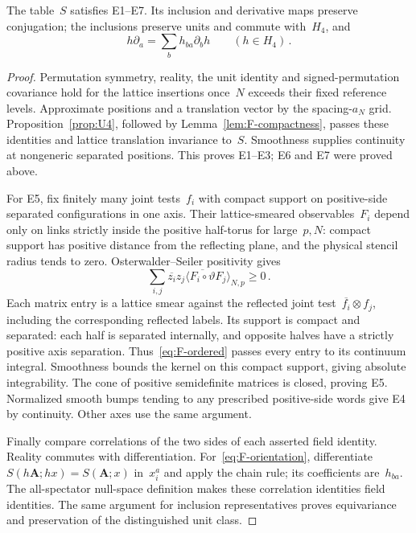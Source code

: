 \begin{lemma}\label{lem:F-euclidean}
The table~$S$ satisfies E1--E7. Its inclusion and derivative maps preserve conjugation; the inclusions preserve units and commute with~$H_4$, and
\begin{equation}\label{eq:F-orientation}
h\partial_a=\sum_bh_{ba}\partial_bh\qquad(h\in H_4)\,.
\end{equation}
\end{lemma}

\begin{proof}
Permutation symmetry, reality, the unit identity and signed-permutation covariance hold for the lattice insertions once~$N$ exceeds their fixed reference levels. Approximate positions and a translation vector by the spacing-$a_N$ grid. Proposition~\ref{prop:U4}, followed by Lemma~\ref{lem:F-compactness}, passes these identities and lattice translation invariance to~$S$. Smoothness supplies continuity at nongeneric separated positions. This proves E1--E3; E6 and E7 were proved above.

For E5, fix finitely many joint tests~$f_i$ with compact support on positive-side separated configurations in one axis. Their lattice-smeared observables~$F_i$ depend only on links strictly inside the positive half-torus for large~$p,N$: compact support has positive distance from the reflecting plane, and the physical stencil radius tends to zero. Osterwalder--Seiler positivity gives
\begin{equation*}
\sum_{i,j}\overline{z_i}z_j\langle\overline{F_i\circ\vartheta}F_j\rangle_{N,p}\ge0\,.
\end{equation*}
Each matrix entry is a lattice smear against the reflected joint test~$\overline{f_i}\otimes f_j$, including the corresponding reflected labels. Its support is compact and separated: each half is separated internally, and opposite halves have a strictly positive axis separation. Thus~\eqref{eq:F-ordered} passes every entry to its continuum integral. Smoothness bounds the kernel on this compact support, giving absolute integrability. The cone of positive semidefinite matrices is closed, proving E5. Normalized smooth bumps tending to any prescribed positive-side words give E4 by continuity. Other axes use the same argument.

Finally compare correlations of the two sides of each asserted field identity. Reality commutes with differentiation. For~\eqref{eq:F-orientation}, differentiate~$S(h\boldsymbol A;hx)=S(\boldsymbol A;x)$ in~$x_i^a$ and apply the chain rule; its coefficients are~$h_{ba}$. The all-spectator null-space definition makes these correlation identities field identities. The same argument for inclusion representatives proves equivariance and preservation of the distinguished unit class.
\end{proof}

